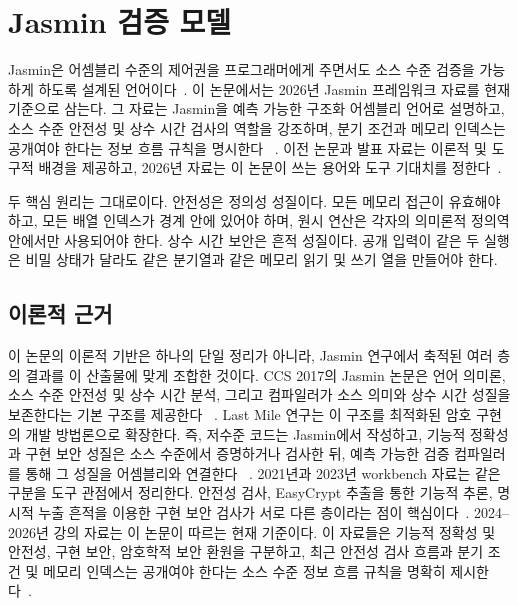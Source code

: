 \documentclass[10pt,twocolumn]{article}
\newcommand{\jasmin}{Jasmin}
\newcommand{\ct}{상수 시간}
\begin{document}
\section{\jasmin{} 검증 모델}

\jasmin{}은 어셈블리 수준의 제어권을 프로그래머에게 주면서도 소스
수준 검증을 가능하게 하도록 설계된 언어이다~\cite{Jasmin2017,LastMile2020}.
이 논문에서는 2026년 \jasmin{} 프레임워크 자료를 현재 기준으로 삼는다.
그 자료는 \jasmin{}을 예측 가능한 구조화 어셈블리 언어로 설명하고,
소스 수준 안전성 및 \ct{} 검사의 역할을 강조하며, 분기 조건과 메모리
인덱스는 공개여야 한다는 정보 흐름 규칙을 명시한다
~\cite{JasminFramework2026}. 이전 논문과 발표 자료는 이론적 및 도구적
배경을 제공하고, 2026년 자료는 이 논문이 쓰는 용어와 도구 기대치를
정한다~\cite{JasminWorkshop2021,JasminWorkbench2023,JasminCourse2024}.

두 핵심 원리는 그대로이다. 안전성은 정의성 성질이다. 모든 메모리 접근이
유효해야 하고, 모든 배열 인덱스가 경계 안에 있어야 하며, 원시 연산은
각자의 의미론적 정의역 안에서만 사용되어야 한다. \ct{} 보안은 흔적
성질이다. 공개 입력이 같은 두 실행은 비밀 상태가 달라도 같은 분기열과
같은 메모리 읽기 및 쓰기 열을 만들어야 한다.

\subsection{이론적 근거}

이 논문의 이론적 기반은 하나의 단일 정리가 아니라, \jasmin{} 연구에서
축적된 여러 층의 결과를 이 산출물에 맞게 조합한 것이다. CCS 2017의
\jasmin{} 논문은 언어 의미론, 소스 수준 안전성 및 \ct{} 분석, 그리고
컴파일러가 소스 의미와 \ct{} 성질을 보존한다는 기본 구조를 제공한다
~\cite{Jasmin2017}. Last Mile 연구는 이 구조를 최적화된 암호 구현의
개발 방법론으로 확장한다. 즉, 저수준 코드는 \jasmin{}에서 작성하고,
기능적 정확성과 구현 보안 성질은 소스 수준에서 증명하거나 검사한 뒤,
예측 가능한 검증 컴파일러를 통해 그 성질을 어셈블리와 연결한다
~\cite{LastMile2020}. 2021년과 2023년 workbench 자료는 같은 구분을
도구 관점에서 정리한다. 안전성 검사, EasyCrypt 추출을 통한 기능적
추론, 명시적 누출 흔적을 이용한 구현 보안 검사가 서로 다른 층이라는
점이 핵심이다~\cite{JasminWorkshop2021,JasminWorkbench2023}. 2024--2026년
강의 자료는 이 논문이 따르는 현재 기준이다. 이 자료들은 기능적 정확성
및 안전성, 구현 보안, 암호학적 보안 환원을 구분하고, 최근 안전성 검사
흐름과 분기 조건 및 메모리 인덱스는 공개여야 한다는 소스 수준 정보
흐름 규칙을 명확히 제시한다~\cite{JasminCourse2024,JasminFramework2026}.
\end{document}
